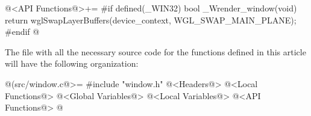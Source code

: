 \iniciocodigo
@<API Functions@>+=
#if defined(_WIN32)
bool _Wrender_window(void){
  return wglSwapLayerBuffers(device_context, WGL_SWAP_MAIN_PLANE);
}
#endif
@
\fimcodigo




The file with all the necessary source code for the functions defined
in this article will have the following organization:

\iniciocodigo
@(src/window.c@>=
#include "window.h"
@<Headers@>
@<Local Functions@>
@<Global Variables@>
@<Local Variables@>
@<API Functions@>
@
\fimcodigo


\fim
